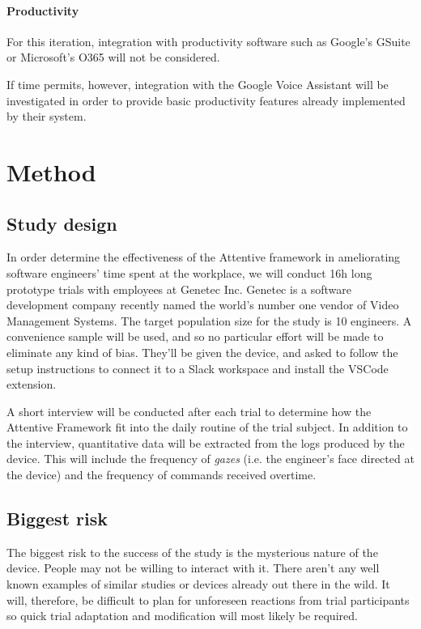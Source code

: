 \documentclass{article}
\begin{document}
\begin{multicols}{2}
\paragraph{Productivity}
For this iteration, integration with productivity software such as Google's GSuite or Microsoft's O365 will not be considered.

If time permits, however, integration with the Google Voice Assistant will be investigated in order to provide basic productivity features already implemented by their system. \cite{googleassskd2020}


\section{Method}

\subsection{Study design}
In order determine the effectiveness of the Attentive framework in ameliorating software engineers' time spent at the workplace, we will conduct 16h long prototype trials with employees at Genetec Inc.
Genetec is a software development company recently named the world’s number one vendor of Video Management Systems.
The target population size for the study is 10 engineers.
A convenience sample will be used, and so no particular effort will be made to eliminate any kind of bias.
They'll be given the device, and asked to follow the setup instructions to connect it to a Slack workspace and install the VSCode extension.

A short interview will be conducted after each trial to determine how the Attentive Framework fit into the daily routine of the trial subject.
In addition to the interview, quantitative data will be extracted from the logs produced by the device.
This will include the frequency of \textit{gazes} (i.e. the engineer's face directed at the device) and the frequency of commands received overtime.
\cite{martakersten2020}

\subsection{Biggest risk}
The biggest risk to the success of the study is the mysterious nature of the device.
People may not be willing to interact with it.
There aren't any well known examples of similar studies or devices already out there in the wild.
It will, therefore, be difficult to plan for unforeseen reactions from trial participants so quick trial adaptation and modification will most likely be required.




\end{multicols}
\end{document}

